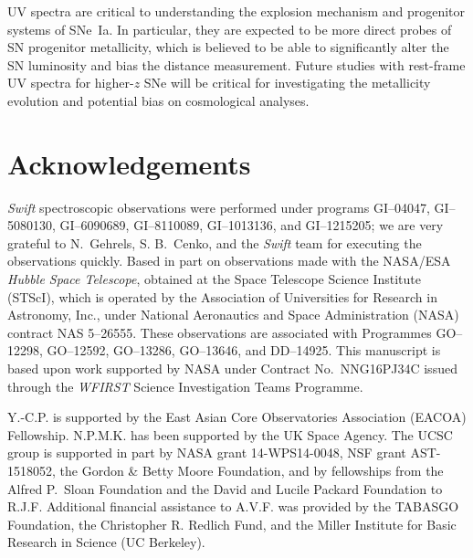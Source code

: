 \documentclass[useAMS,usenatbib]{mn2e}
\begin{document}
UV spectra are critical to understanding the explosion mechanism and progenitor systems of SNe~Ia. In particular, they are expected to be more direct probes of SN progenitor metallicity, which is believed to be able to significantly alter the SN luminosity and bias the distance measurement. Future studies with rest-frame UV spectra for higher-$z$ SNe will be critical for investigating the metallicity evolution and potential bias on cosmological analyses.

\section{Acknowledgements}
\label{sec:acknowledgements}
{\it Swift} spectroscopic observations were performed under programs
GI--04047, GI--5080130, GI--6090689, GI--8110089, GI--1013136, and
GI--1215205; we are very grateful to N.\ Gehrels, S. B.\ Cenko, and the
{\it Swift} team for executing the observations quickly.
Based in part on observations made with the NASA/ESA {\it Hubble Space
  Telescope}, obtained at the Space Telescope Science Institute
(STScI), which is operated by the Association of Universities for
Research in Astronomy, Inc., under National Aeronautics and Space
Administration (NASA) contract NAS 5--26555. These observations are
associated with Programmes GO--12298, GO--12592, GO--13286, GO--13646,
and DD--14925.  This manuscript is based upon work supported by NASA
under Contract No.\ NNG16PJ34C issued through the {\it WFIRST} Science
Investigation Teams Programme.

Y.-C.P. is supported by the East Asian Core Observatories Association (EACOA)
Fellowship. N.P.M.K. has been supported by the UK Space Agency.  
The UCSC group is supported in part by NASA grant 14-WPS14-0048, NSF grant
AST-1518052, the Gordon \& Betty Moore Foundation, and by fellowships
from the Alfred P.\ Sloan Foundation and the David and Lucile Packard
Foundation to R.J.F. Additional financial assistance to A.V.F. was
provided by the TABASGO Foundation, the Christopher R. Redlich Fund,
and the Miller Institute for Basic Research in Science (UC Berkeley).
\end{document}

